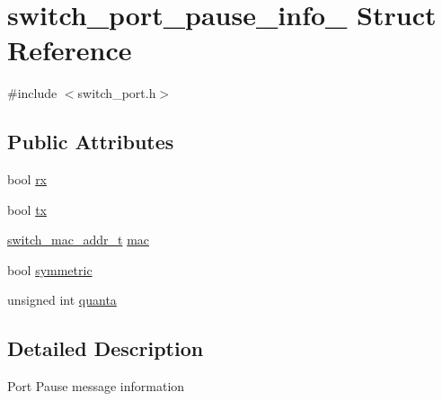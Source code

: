 \hypertarget{structswitch__port__pause__info__}{\section{switch\+\_\+port\+\_\+pause\+\_\+info\+\_\+ Struct Reference}
\label{structswitch__port__pause__info__}
}


{\ttfamily \#include $<$switch\+\_\+port.\+h$>$}

\subsection*{Public Attributes}
\begin{DoxyCompactItemize}
\item 
bool \hyperlink{structswitch__port__pause__info___a920238ca28555086724ea12235ec0f3e}{rx}
\item 
bool \hyperlink{structswitch__port__pause__info___adbeeee9205cc790f6f3e1acd5063fb19}{tx}
\item 
\hyperlink{structswitch__mac__addr__s}{switch\+\_\+mac\+\_\+addr\+\_\+t} \hyperlink{structswitch__port__pause__info___affba5a33b49d1fe90c039eb455a0cdb8}{mac}
\item 
bool \hyperlink{structswitch__port__pause__info___acfc8be4a685c9ffbf3acb06948c167e6}{symmetric}
\item 
unsigned int \hyperlink{structswitch__port__pause__info___a5537bf1e9ba77d29d7f1a3cd9bb97f7e}{quanta}
\end{DoxyCompactItemize}


\subsection{Detailed Description}
Port Pause message information 

